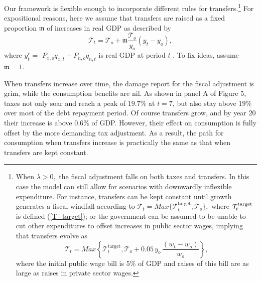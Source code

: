 \documentclass[11pt]{article}
\begin{document}
Our framework is flexible enough to incorporate different rules for
transfers.\footnote{%
When $\lambda >0,$ the fiscal adjustment falls on both taxes and transfers.
In this case the model can still allow for scenarios with downwardly
inflexible expenditure. For instance, transfers can be kept constant until
growth generates a fiscal windfall according to $\mathcal{T}_{t}=Max\{%
\mathcal{T}_{t}^{\text{target}},\mathcal{T}_{o}\},$ where $\mathcal{T}_{t}^{%
\text{target}}$ is defined (\ref{T_target}); or the government can be
assumed to be unable to cut other expenditures to offset increases in public
sector wages, implying that transfers evolve as 
\begin{equation*}
\mathcal{T}_{t}=Max\left\{ \mathcal{T}_{t}^{\text{target}},\mathcal{T}%
_{o}+0.05\,y_{o}\,\frac{(w_{t}-w_{o})}{w_{o}}\right\} ,
\end{equation*}%
where the initial public wage bill is 5\% of GDP and raises of this bill are
as large as raises in private sector wages.} For expositional reasons, here
we assume that transfers are raised as a fixed proportion $\mathfrak{m}$ of
increases in real GDP as described by%
\begin{equation*}
\mathcal{T}_{t}=\mathcal{T}_{o}+\mathfrak{m}\frac{\mathcal{T}_{o}}{y_{o}}%
(y_{t}-y_{o}),
\end{equation*}%
where $y_{t}^{r}=$ $P_{x,o}q_{x,t}+P_{n,o}q_{n,t}$ is real GDP at period $t$%
. To fix ideas, assume $\mathfrak{m}=1$.


When transfers increase over time, the damage report for the fiscal
adjustment is grim, while the consumption benefits are nil. As shown in
panel A of Figure 5, taxes not only soar and reach a peak of $19.7\%$ at $%
t=7 $, but also stay above $19\%$ over most of the debt repayment period. Of
course transfers grow, and by year 20 their increase is above $0.6\%$ of
GDP. However, their effect on consumption is fully offset by the more
demanding tax adjustment. As a result, the path for consumption when
transfers increase is practically the same as that when transfers are kept
constant.
\end{document}
